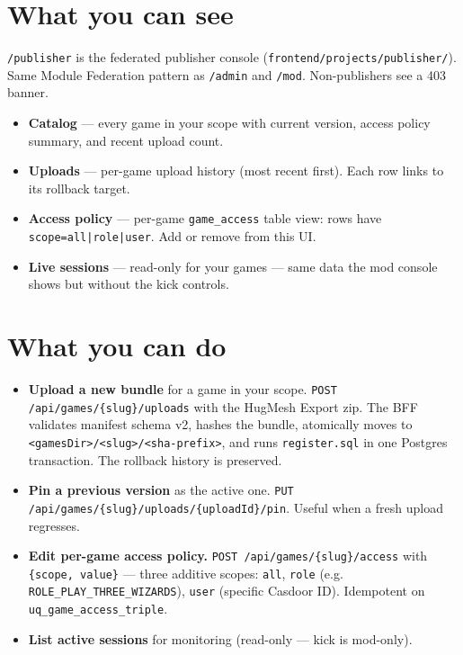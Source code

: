 \documentclass[11pt,a4paper,openany]{book}
\begin{document}
\chapter{What you can see}
\texttt{/publisher} is the federated publisher console
(\texttt{frontend/projects/publisher/}). Same Module Federation
pattern as \texttt{/admin} and \texttt{/mod}. Non-publishers see a 403
banner.

\begin{itemize}
  \item \textbf{Catalog} --- every game in your scope with current
        version, access policy summary, and recent upload count.
  \item \textbf{Uploads} --- per-game upload history (most recent
        first). Each row links to its rollback target.
  \item \textbf{Access policy} --- per-game \texttt{game\_access}
        table view: rows have \texttt{scope=all|role|user}. Add or
        remove from this UI.
  \item \textbf{Live sessions} --- read-only for your games --- same
        data the mod console shows but without the kick controls.
\end{itemize}

\chapter{What you can do}
\begin{itemize}
  \item \textbf{Upload a new bundle} for a game in your scope.
        \texttt{POST /api/games/\{slug\}/uploads} with the HugMesh
        Export zip. The BFF validates manifest schema v2, hashes the
        bundle, atomically moves to
        \texttt{<gamesDir>/<slug>/<sha-prefix>}, and runs
        \texttt{register.sql} in one Postgres transaction. The
        rollback history is preserved.
  \item \textbf{Pin a previous version} as the active one.
        \texttt{PUT /api/games/\{slug\}/uploads/\{uploadId\}/pin}.
        Useful when a fresh upload regresses.
  \item \textbf{Edit per-game access policy.}
        \texttt{POST /api/games/\{slug\}/access} with
        \texttt{\{scope, value\}} --- three additive scopes:
        \texttt{all}, \texttt{role} (e.g.
        \texttt{ROLE\_PLAY\_THREE\_WIZARDS}), \texttt{user} (specific
        Casdoor ID). Idempotent on \texttt{uq\_game\_access\_triple}.
  \item \textbf{List active sessions} for monitoring (read-only ---
        kick is mod-only).
\end{itemize}
\end{document}

